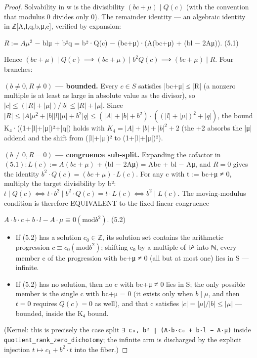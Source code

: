 \begin{proof}
Solvability in w is the divisibility $(bc+μ) ∣ Q(c)$ (with the convention that modulus 0 divides only 0). The remainder identity — an algebraic identity in ℤ[A,l,q,b,μ,c], verified by expansion:

$R := Aμ^{2}$ − blμ + b²q      = b²·Q(c) − (bc+μ)·(A(bc+μ) + (bl − 2Aμ)).                (5.1)

Hence $(bc+μ) ∣ Q(c)$ ⟹ $(bc+μ) ∣ b^{2}Q(c)$ ⟹ $(bc+μ) ∣ R$. Four branches:

\textbf{$(b ≠ 0, R ≠ 0)$ — bounded.} Every $c ∈ S$ satisfies |bc+μ| ≤ |R| (a nonzero multiple is at least as large in absolute value as the divisor), so $|c| ≤ (|R|+|μ|)/|b| ≤ |R|+|μ|$. Since $|R| ≤ |A|μ^{2} + |b||l||μ| + b^{2}|q| ≤ (|A|+|b|+b^{2})·((|l|+|μ|)^{2} + |q|)$, the bound K₄·((1+|l|+|μ|)²+|q|) holds with $K_{4} = |A|+|b|+|b|^{2}+2$ (the +2 absorbs the |μ| addend and the shift from (|l|+|μ|)² to (1+|l|+|μ|)²).

\textbf{$(b ≠ 0, R = 0)$ — congruence sub-split.} Expanding the cofactor in $(5.1): L(c) := A(bc+μ)$ + (bl − 2Aμ) = Abc + bl − Aμ, and $R = 0$ gives the identity $b^{2}·Q(c) = (bc+μ)·L(c)$. For any c with t := bc+μ ≠ 0, multiply the target divisibility by b²:  $t ∣ Q(c) ⟺ t·b^{2} ∣ b^{2}·Q(c) = t·L(c) ⟺ b^{2} ∣ L(c)$. The moving-modulus condition is therefore EQUIVALENT to the fixed linear congruence

$A·b·c + b·l − A·μ ≡ 0 (\mathrm{mod} b^{2})$.                              (5.2)

\begin{itemize}
\item If (5.2) has a solution $c_{0} ∈ ℤ$, its solution set contains the arithmetic
progression $c ≡ c_{0} (\mathrm{mod} b^{2})$; shifting c₀ by a multiple of b² into ℕ, every   member c of the progression with bc+μ ≠ 0 (all but at most one) lies in S   — infinite.

\item If (5.2) has no solution, then no c with bc+μ ≠ 0 lies in S; the only
possible member is the single c with bc+μ = 0 (it exists only when   $b ∣ μ$, and then $t = 0$ requires $Q(c) = 0$ as well), and that c satisfies   $|c| = |μ|/|b| ≤ |μ|$ — bounded, inside the K₄ bound.

\end{itemize}
(Kernel: this is precisely the case split \texttt{∃ c₀, b² ∣ (A·b·c₀ + b·l − A·μ)} inside \texttt{quotient\_\allowbreak{}rank\_\allowbreak{}zero\_\allowbreak{}dichotomy}; the infinite arm is discharged by the explicit injection $t ↦ c_{1} + b^{2}·t$ into the fiber.)


\end{proof}
